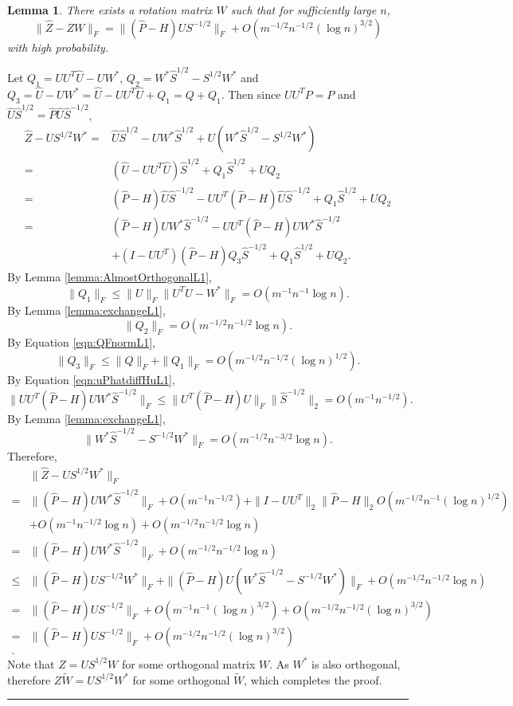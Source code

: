 \documentclass[a4paper]{article}
\newenvironment{proof}{{\bf Proof:  }}{\hfill\rule{2mm}{2mm}}
\newtheorem{lemma}[fact]{Lemma}
\begin{document}
\begin{lemma}
\label{lemma:XhatDiffXWexpressionL1}
There exists a rotation matrix $W$ such that for sufficiently large $n$,
\[
	\|\hat{Z} - Z W\|_F = \| (\hat{P} - H) U S^{-1/2} \|_F + O(m^{-1/2} n^{-1/2} (\log n)^{3/2})
\]
with high probability.
\end{lemma}
\begin{proof}
Let $Q_1 = U U^T \hat{U} - U W^*$, $Q_2 = W^* \hat{S}^{1/2} - S^{1/2} W^*$ and $Q_3 = \hat{U} - U W^* = \hat{U} - U U^T \hat{U} + Q_1 = Q + Q_1$. Then since $U U^T P = P$ and $\hat{U} \hat{S}^{1/2} = \hat{P} \hat{U} \hat{S}^{-1/2}$,
\begin{align*}
	\hat{Z} - U S^{1/2} W^*
    = & \hat{U} \hat{S}^{1/2} - U W^* \hat{S}^{1/2} + U(W^* \hat{S}^{1/2} - S^{1/2} W^*) \\
    = & (\hat{U} - U U^T \hat{U}) \hat{S}^{1/2} + Q_1 \hat{S}^{1/2} + U Q_2 \\
    = & (\hat{P} - H) \hat{U} \hat{S}^{-1/2} - U U^T(\hat{P} - H)\hat{U}\hat{S}^{-1/2} + Q_1 \hat{S}^{1/2} + U Q_2 \\
    = & (\hat{P} - H) U W^* \hat{S}^{-1/2} - U U^T(\hat{P} - H)U W^*\hat{S}^{-1/2} \\
    & + (I - U U^T)(\hat{P} - H) Q_3 \hat{S}^{-1/2} + Q_1 \hat{S}^{1/2} + U Q_2.
\end{align*}
By Lemma \ref{lemma:AlmostOrthogonalL1},
\[
	\|Q_1\|_F \le \| U\|_F \| U^T \hat{U} - W^* \|_F = O(m^{-1} n^{-1} \log n).
\]
By Lemma \ref{lemma:exchangeL1},
\[
	\|Q_2\|_F = O(m^{-1/2} n^{-1/2} \log n).
\]
By Equation \ref{eqn:QFnormL1},
\[
	\|Q_3\|_F \le \|Q\|_F + \|Q_1\|_F = O(m^{-1/2} n^{-1/2} (\log n)^{1/2}).
\]
By Equation \ref{eqn:uPhatdiffHuL1},
\[
	\| U U^T(\hat{P} - H)U W^*\hat{S}^{-1/2} \|_F
    \le \| U^T(\hat{P} - H)U \|_F \| \hat{S}^{-1/2} \|_2
    = O(m^{-1} n^{-1/2}).
\]
By Lemma \ref{lemma:exchangeL1},
\[
	\| W^* \hat{S}^{-1/2} - S^{-1/2} W^* \|_F = O(m^{-1/2} n^{-3/2} \log n).
\]
Therefore,
\begin{align*}
	& \| \hat{Z} - U S^{1/2} W^* \|_F \\
    = & \| (\hat{P} - H) U W^* \hat{S}^{-1/2} \|_F + O(m^{-1} n^{-1/2})
    + \|I - U U^T \|_2 \| \hat{P} - H \|_2 O(m^{-1/2} n^{-1} (\log n)^{1/2}) \\
    & + O(m^{-1} n^{-1/2} \log n) + O(m^{-1/2} n^{-1/2} \log n)\\
    = & \| (\hat{P} - H) U W^* \hat{S}^{-1/2} \|_F + O(m^{-1/2} n^{-1/2} \log n) \\
    \le & \| (\hat{P} - H) U S^{-1/2} W^* \|_F + \|(\hat{P} - H) U (W^* \hat{S}^{-1/2} - S^{-1/2} W^*) \|_F + O(m^{-1/2} n^{-1/2} \log n) \\
    = & \| (\hat{P} - H) U S^{-1/2}\|_F + O(m^{-1} n^{-1} (\log n)^{3/2}) + O(m^{-1/2} n^{-1/2} (\log n)^{3/2}) \\
    = & \| (\hat{P} - H) U S^{-1/2}\|_F + O(m^{-1/2} n^{-1/2} (\log n)^{3/2}) \\.
\end{align*}
Note that $Z = U S^{1/2} W$ for some orthogonal matrix $W$. As $W^*$ is also orthogonal, therefore $Z \tilde{W} = U S^{1/2} W^*$ for some orthogonal $\tilde{W}$, which completes the proof.
\end{proof}
\end{document}
